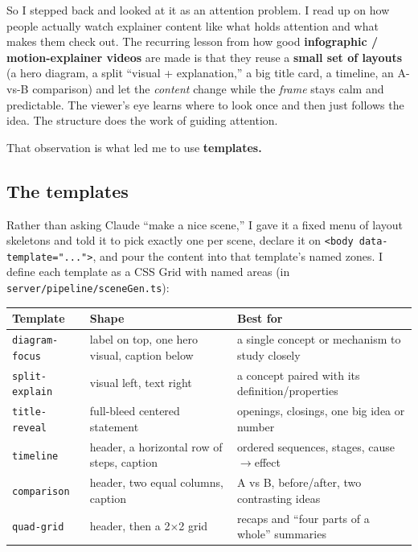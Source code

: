 \documentclass[11pt]{article}
\newcommand{\code}[1]{\texttt{#1}}
\begin{document}
So I stepped back and looked at it as an attention problem. I read up on how people actually watch explainer content like what holds
attention and what makes them check out. The recurring lesson from how good
\textbf{infographic / motion-explainer videos} are made is that they reuse a \textbf{small set of layouts} (a hero
diagram, a split ``visual + explanation,'' a big title card, a timeline, an A-vs-B
comparison) and let the \emph{content} change while the \emph{frame} stays calm and
predictable. The viewer's eye learns where to look once and then just follows
the idea. The structure does the work of guiding attention.

That observation is what led me to use \textbf{templates.}

\subsection*{The templates}

Rather than asking Claude ``make a nice scene,'' I gave it a fixed menu of layout
skeletons and told it to pick exactly one per scene, declare it on
\code{<body data-template="...">}, and pour the content into that template's named
zones. I define each template as a CSS Grid with named areas (in
\code{server/pipeline/sceneGen.ts}):

\begin{center}
\small
\begin{tabular}{@{}>{\raggedright\arraybackslash}p{}>{\raggedright\arraybackslash}p{}>{\raggedright\arraybackslash}p{}@{}}
\toprule
\textbf{Template} & \textbf{Shape} & \textbf{Best for} \\
\midrule
\code{diagram-focus} & label on top, one hero visual, caption below & a single concept or mechanism to study closely \\
\code{split-explain} & visual left, text right & a concept paired with its definition/properties \\
\code{title-reveal} & full-bleed centered statement & openings, closings, one big idea or number \\
\code{timeline} & header, a horizontal row of steps, caption & ordered sequences, stages, cause$\rightarrow$effect \\
\code{comparison} & header, two equal columns, caption & A vs B, before/after, two contrasting ideas \\
\code{quad-grid} & header, then a 2$\times$2 grid & recaps and ``four parts of a whole'' summaries \\
\bottomrule
\end{tabular}
\end{center}
\end{document}
